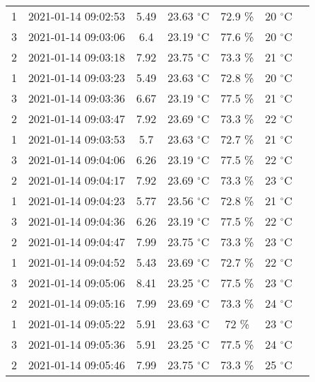 \begin{itemize}
\begin{table}[H]
\begin{tabular}{ccccccc}
            		\midrule
            		  1 & 2021-01-14 09:02:53 & 5.49 & 23.63 $^{\circ}$C & 72.9 \% & 20 $^{\circ}$C  \\  
                     3 & 2021-01-14 09:03:06 & 6.4 & 23.19 $^{\circ}$C & 77.6 \% & 20 $^{\circ}$C   \\  
                    2 & 2021-01-14 09:03:18  & 7.92 & 23.75 $^{\circ}$C & 73.3 \% & 21 $^{\circ}$C  \\  
                     1 & 2021-01-14 09:03:23  & 5.49 & 23.63 $^{\circ}$C & 72.8 \% & 20 $^{\circ}$C  \\  
                     3 & 2021-01-14 09:03:36   & 6.67 & 23.19 $^{\circ}$C & 77.5 \% & 21 $^{\circ}$C \\  
                      2 & 2021-01-14 09:03:47 & 7.92 & 23.69 $^{\circ}$C & 73.3 \% & 22 $^{\circ}$C \\  
                      1 & 2021-01-14 09:03:53 & 5.7 & 23.63 $^{\circ}$C & 72.7 \% & 21 $^{\circ}$C \\  
                      3 & 2021-01-14 09:04:06 & 6.26 & 23.19 $^{\circ}$C & 77.5 \% & 22 $^{\circ}$C \\  
                      2 & 2021-01-14 09:04:17 & 7.92 & 23.69 $^{\circ}$C & 73.3 \% & 23 $^{\circ}$C \\  
                      1 & 2021-01-14 09:04:23 & 5.77 & 23.56 $^{\circ}$C & 72.8 \% & 21 $^{\circ}$C \\  
                      3 & 2021-01-14 09:04:36 & 6.26 & 23.19 $^{\circ}$C & 77.5 \% & 22 $^{\circ}$C  \\  
                      2 & 2021-01-14 09:04:47 & 7.99 & 23.75 $^{\circ}$C & 73.3 \% & 23 $^{\circ}$C \\  
                     1 & 2021-01-14 09:04:52 & 5.43 & 23.69 $^{\circ}$C & 72.7 \% & 22 $^{\circ}$C   \\  
                      3 & 2021-01-14 09:05:06 & 8.41 & 23.25 $^{\circ}$C & 77.5 \% & 23 $^{\circ}$C   \\  
                      2 & 2021-01-14 09:05:16 & 7.99 & 23.69 $^{\circ}$C & 73.3 \% & 24 $^{\circ}$C \\  
                      1 & 2021-01-14 09:05:22 & 5.91 & 23.63 $^{\circ}$C & 72 \% & 23 $^{\circ}$C  \\  
                     3 & 2021-01-14 09:05:36 & 5.91 & 23.25 $^{\circ}$C & 77.5 \% & 24 $^{\circ}$C  \\  
                      2 & 2021-01-14 09:05:46 & 7.99 & 23.75 $^{\circ}$C & 73.3 \% & 25 $^{\circ}$C  \\  

\end{tabular}
\end{table}
\end{itemize}
